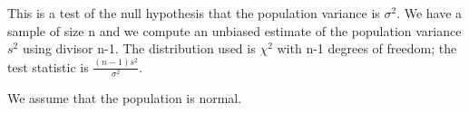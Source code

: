  This is a test of the null hypothesis that the population variance
is $ \sigma ^2 . $ We have a sample of size n and we compute
an unbiased estimate of the population variance $s^{2}$  using divisor
n-1. The distribution used is $ \chi ^2 $ with n-1 degrees of 
freedom; the test statistic is $ \frac{(n-1)s^2}{\sigma ^2 } . $
\par
We assume that the population is normal.
